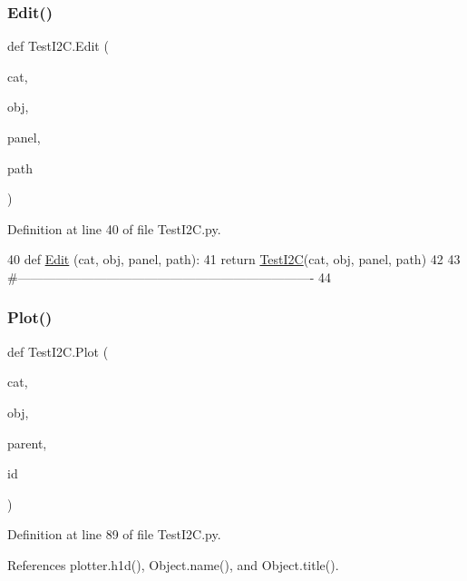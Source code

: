 \subsubsection{\texorpdfstring{Edit()}{Edit()}}
{\footnotesize\ttfamily def Test\+I2\+C.\+Edit (\begin{DoxyParamCaption}\item[{}]{cat,  }\item[{}]{obj,  }\item[{}]{panel,  }\item[{}]{path }\end{DoxyParamCaption})}



Definition at line 40 of file Test\+I2\+C.\+py.


\begin{DoxyCode}
40 \textcolor{keyword}{def }\hyperlink{namespaceTestI2C_a297b4dc00ac23a510d82a60f41fa54bf}{Edit} (cat, obj, panel, path):
41     \textcolor{keywordflow}{return} \hyperlink{classTestI2C}{TestI2C}(cat, obj, panel, path)
42 
43 \textcolor{comment}{#----------------------------------------------------------------------}
44 
\end{DoxyCode}
\mbox{\label{namespaceTestI2C_a4c750a8d76615040e7e0203c9f2c4dd7}} 
\subsubsection{\texorpdfstring{Plot()}{Plot()}}
{\footnotesize\ttfamily def Test\+I2\+C.\+Plot (\begin{DoxyParamCaption}\item[{}]{cat,  }\item[{}]{obj,  }\item[{}]{parent,  }\item[{}]{id }\end{DoxyParamCaption})}



Definition at line 89 of file Test\+I2\+C.\+py.



References plotter.\+h1d(), Object.\+name(), and Object.\+title().


